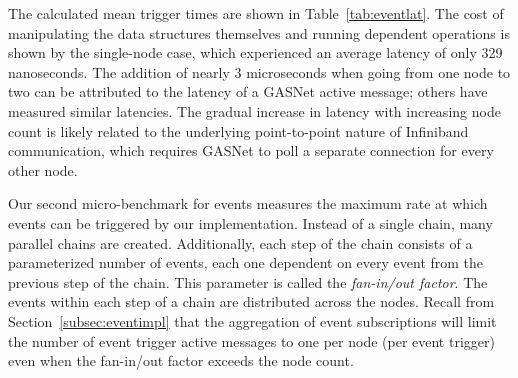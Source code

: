 
The calculated mean trigger times are shown in Table~\ref{tab:eventlat}.
The cost of manipulating the data structures themselves and running dependent
operations is shown by the single-node case, which experienced an average
latency of only 329 nanoseconds.  The addition of nearly 3 microseconds when
going from one node to two can be attributed to the latency of a GASNet
active message; others have measured similar latencies\cite{GASNET06}.
The gradual increase in latency with increasing node count is likely 
related to the underlying point-to-point nature of Infiniband communication,
which requires GASNet to poll a separate connection for every other node.

Our second micro-benchmark for events measures the maximum rate at which events can
be triggered by our implementation.  Instead of a single chain, many parallel chains
are created.  Additionally, each step of the chain consists of a parameterized number
of events, each one dependent on every event from the previous step of the chain.
This parameter is called the {\em fan-in/out factor}.  The events within each step of
a chain are distributed across the nodes.  Recall from Section~\ref{subsec:eventimpl}
that the aggregation of event subscriptions
will limit the number of event trigger active messages to one per node (per event trigger)
even when the fan-in/out factor exceeds the node count.


